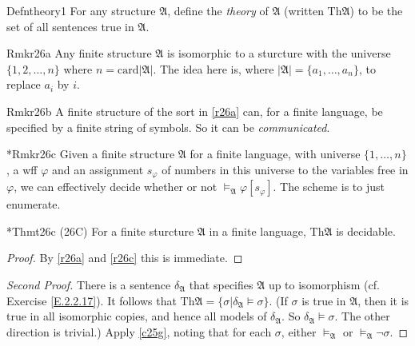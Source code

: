 \begin{reference}{Defn}{theory1}
  For any structure $\mathfrak{A}$, define the \textit{theory} of $\mathfrak{A}$ (written $\mathrm{Th}\mathfrak{A}$) to be the set of all sentences true in $\mathfrak{A}$.
\end{reference}

\begin{reference}{Rmk}{r26a}
  Any finite structure $\mathfrak{A}$ is isomorphic to a sturcture with the universe $\{1,2,\dots,n\}$ where $n=\mathrm{card}|\mathfrak{A}|$. The idea here is, where $|\mathfrak{A}|=\{a_1,\dots,a_n\}$, to replace $a_i$ by $i$.
\end{reference}

\begin{reference}{Rmk}{r26b}
  A finite structure of the sort in \ref{r26a} can, for a finite language, be specified by a finite string of symbols. So it can be \textit{communicated}.
\end{reference}

\begin{reference}{*Rmk}{r26c}
  Given a finite structure $\mathfrak{A}$ for a finite language, with universe $\{1,\dots,n\}$, a wff $\varphi$ and an assignment $s_{\varphi}$ of numbers in this universe to the variables free in $\varphi$, we can effectively decide whether or not $\vDash_{\mathfrak{A}}\varphi[s_{\varphi}]$. The scheme is to just enumerate.
\end{reference}

\begin{reference}{*Thm}{t26c}
  (26C) For a finite sturcture $\mathfrak{A}$ in a finite language, $\mathrm{Th}\mathfrak{A}$ is decidable.
\end{reference}

\begin{proof}
  By \ref{r26a} and \ref{r26c} this is immediate.
\end{proof}

\begin{proof}[Second Proof]
  There is a sentence $\delta_{\mathfrak{A}}$ that specifies $\mathfrak{A}$ up to isomorphism (cf. Exercise \ref{E.2.2.17}). It follows that $\mathrm{Th}\mathfrak{A}=\{\sigma|\delta_{\mathfrak{A}}\vDash \sigma\}.$ (If $\sigma$ is true in $\mathfrak{A}$, then it is true in all isomorphic copies, and hence all models of $\delta_{\mathfrak{A}}$. So $\delta_{\mathfrak{A}}\vDash \sigma$. The other direction is trivial.) Apply \ref{c25g}, noting that for each $\sigma$, either $\vDash_{\mathfrak{A}}$ or $\vDash_{\mathfrak{A}}\neg \sigma$.
\end{proof}

